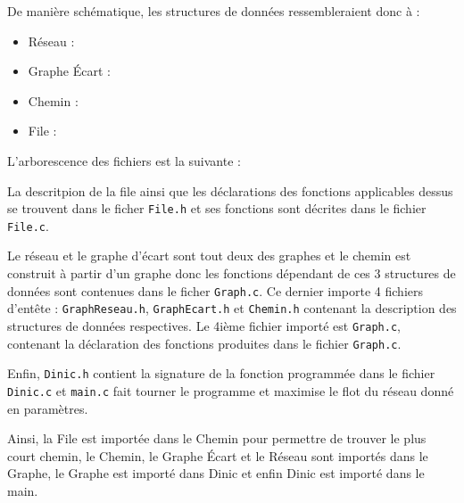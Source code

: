 \documentclass[11pt, a4paper]{report}
\begin{document}
	De manière schématique, les structures de données ressembleraient donc à :
	\begin{itemize}
        \item Réseau :\\
        \item Graphe Écart :\\
        \item Chemin :\\
        \item File :\\
	\end{itemize}
	
	L'arborescence des fichiers est la suivante :
	
	
	La descritpion de la file ainsi que les déclarations des fonctions applicables dessus se trouvent dans le ficher \verb|File.h| et ses fonctions sont décrites dans le fichier \verb|File.c|.
	
	Le réseau et le graphe d'écart sont tout deux des graphes et le chemin est construit à partir d'un graphe donc les fonctions dépendant de ces 3 structures de données sont contenues dans le ficher \verb|Graph.c|. Ce dernier importe 4 fichiers d'entête : \verb|GraphReseau.h|, \verb|GraphEcart.h| et \verb|Chemin.h| contenant la description des structures de données respectives. Le 4ième fichier importé est \verb|Graph.c|, contenant la déclaration des fonctions produites dans le fichier \verb|Graph.c|.
	
	Enfin, \verb|Dinic.h| contient la signature de la fonction programmée dans le fichier \verb|Dinic.c| et \verb|main.c| fait tourner le programme et maximise le flot du réseau donné en paramètres.
	
	Ainsi, la File est importée dans le Chemin pour permettre de trouver le plus court chemin, le Chemin, le Graphe Écart et le Réseau sont importés dans le Graphe, le Graphe est importé dans Dinic et enfin Dinic est importé dans le main.
	
\end{document}

